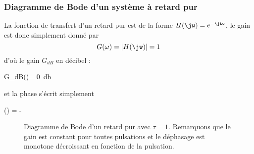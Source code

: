 \subsubsection{Diagramme de Bode d'un système à retard pur}
La fonction de transfert d'un retard pur est de la forme $H(\jw)=e^{-\jtw}$,
le gain est donc simplement donné par
\[
G(\omega)=|H(\jw)|=1
\]
d'où le gain $G_{dB}$ en décibel :
\begin{bequation}
    G_{dB}(\omega)= \SI{0}{\decibel}
\end{bequation}
et la phase s'écrit simplement
\begin{bequation}
    \phi(\omega) = -\tau\omega
\end{bequation}
\begin{figure}[!htb]
    \centering
    

    
    \caption{Diagramme de Bode d'un retard pur 
             avec $\tau=1$. Remarquons que le gain est constant pour toutes 
             pulsations et le déphasage est monotone décroissant en fonction 
             de la pulsation\label{fig-bode_retard_1}.}
\end{figure}
\newpage
